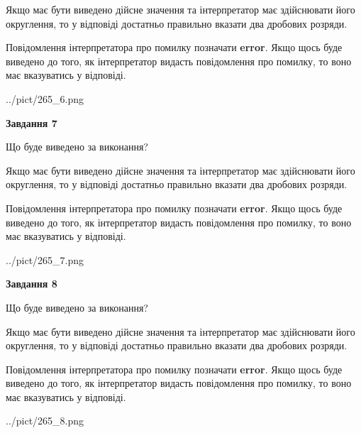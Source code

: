 \documentclass[12pt, ukrainian]{article}
\begin{document}
{\begin {Large}
Якщо має бути виведено дійсне значення та інтерпретатор має здійснювати його округлення, 
то у відповіді достатньо правильно вказати два дробових розряди.

Повідомлення інтерпретатора про помилку позначати \textbf{error}.
Якщо щось буде виведено до того, як інтерпретатор видасть повідомлення про помилку, 
то воно має вказуватись у відповіді. \par

\begin{center}
	{../pict/265_6.png}
\end{center}
\newpage

{\begin {center}\textbf{Завдання 7}\end {center}}\par
Що буде виведено за виконання? \par

Якщо має бути виведено дійсне значення та інтерпретатор має здійснювати його округлення, 
то у відповіді достатньо правильно вказати два дробових розряди.

Повідомлення інтерпретатора про помилку позначати \textbf{error}.
Якщо щось буде виведено до того, як інтерпретатор видасть повідомлення про помилку, 
то воно має вказуватись у відповіді. \par

\begin{center}
	{../pict/265_7.png}
\end{center}
\newpage

{\begin {center}\textbf{Завдання 8}\end {center}}\par
Що буде виведено за виконання? \par

Якщо має бути виведено дійсне значення та інтерпретатор має здійснювати його округлення, 
то у відповіді достатньо правильно вказати два дробових розряди.

Повідомлення інтерпретатора про помилку позначати \textbf{error}.
Якщо щось буде виведено до того, як інтерпретатор видасть повідомлення про помилку, 
то воно має вказуватись у відповіді. \par

\begin{center}
	{../pict/265_8.png}
\end{center}
\newpage


\end{Large}}
\end{document}
